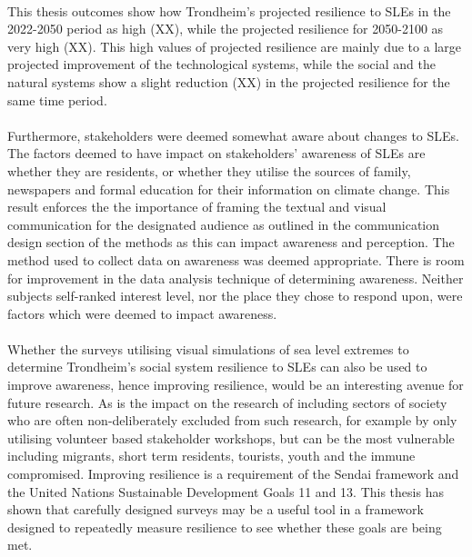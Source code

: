 \paragraph{}
This thesis outcomes show how Trondheim's projected resilience to SLEs in the 2022-2050 period as high (XX), while the projected resilience for 2050-2100 as very high (XX). This high values of projected resilience are mainly due to a large projected improvement of the technological systems, while the social and the natural systems show a slight reduction (XX) in the projected resilience for the same time period.

\paragraph{}
Furthermore, stakeholders were deemed somewhat aware about changes to SLEs. The factors deemed to have impact on stakeholders' awareness of SLEs are whether they are residents, or whether they utilise the sources of family, newspapers and formal education for their information on climate change. This result enforces the the importance of framing the textual and visual communication for the designated audience as outlined in the communication design section of the methods as this can impact awareness and perception.  The method used to collect data on awareness was deemed appropriate. There is room for improvement in the data analysis technique of determining awareness. Neither subjects self-ranked interest level, nor the place they chose to respond upon, were factors which were deemed to impact awareness.
\paragraph{}



Whether the surveys utilising visual simulations of sea level extremes to determine Trondheim's social system resilience to SLEs can also be used to improve awareness, hence improving resilience, would be an interesting avenue for future research. As is the impact on the research of including sectors of society who are often non-deliberately excluded from such research, for example by only utilising volunteer based stakeholder workshops, but can be the most vulnerable including migrants, short term residents, tourists, youth and the immune compromised. Improving resilience is a requirement of the Sendai framework and the United Nations Sustainable Development Goals 11 and 13. This thesis has shown that carefully designed surveys may be a useful tool in a framework designed to repeatedly measure resilience to see whether these goals are being met.


